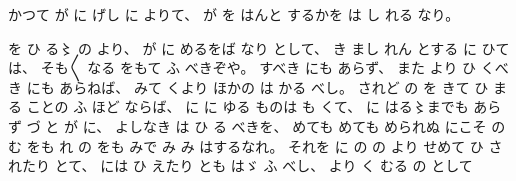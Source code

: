 
%
かつて
が
に
げし
に
よりて、
%
が
を
はんと
するかを
は
し
れる
なり。

%
を
ひ
る〻%
の
より、
%
が
に
めるをば
なり
として、
%
き
まし
れん
とする
に
ひては、
%
そも〳〵
なる
をもて
ふ
べきぞや。
%
すべき
にも
あらず、
%
また
より
ひ
くべき
にも
あらねば、
%
みて%
くより
ほかの
は
かる
べし。
%
されど
の
を
きて
ひ
まる
ことの
ふ
%
ほど
ならば、
%
に
に
ゆる
ものは
も
くて、
%
に
はる〻までも%
あらず
づ
と
が
に、
%
よしなき
は
ひ
る
べきを、
%
めても
めても
められぬ
にこそ
の
む%
をも
れ
の
をも
みで
み
み
はするなれ。
%
それを
に
の
の
より
せめて
ひ
されたり
とて、
%
には
ひ
えたり
とも
はゞ%
ふ
べし、
%
より%
く
むる
の
として
